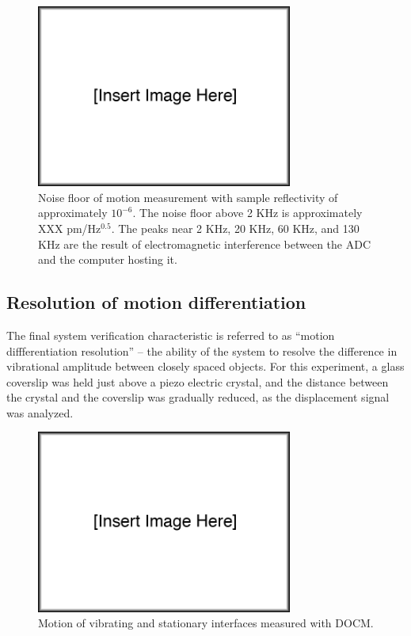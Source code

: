 \begin{figure}[h!]
\centering
\includegraphics[width=0.75\textwidth]{Images/missing.png}
\caption[Noise floor of motion measurement with sample reflectivity of approximately $10^{-6}$.]{Noise floor of motion measurement with sample reflectivity of approximately $10^{-6}$. The noise floor above 2 KHz is approximately XXX pm/Hz$^{0.5}$. The peaks near 2 KHz, 20 KHz, 60 KHz, and 130 KHz are the result of electromagnetic interference between the ADC and the computer hosting it. \label{ref:noise_floor2}}
\end{figure}


\subsection{Resolution of motion differentiation}

The final system verification characteristic is referred to as ``motion diffferentiation resolution'' -- the ability of the system to resolve the difference in vibrational amplitude between closely spaced objects. For this experiment, a glass coverslip was held just above a piezo electric crystal, and the distance between the crystal and the coverslip was gradually reduced, as the displacement signal was analyzed.

\begin{figure}[h!]
\centering
\includegraphics[width=0.75\textwidth]{Images/missing.png}
\caption{Motion of vibrating and stationary interfaces measured with DOCM.}
\end{figure}

